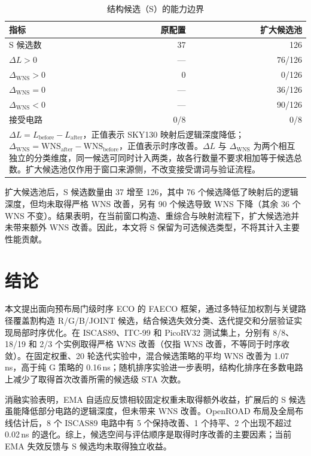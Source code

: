 \documentclass[twocolumn,10pt,fontset=windows]{ctexart}
\begin{document}
\begin{table}[H]
\centering
\caption{结构候选（S）的能力边界}
\label{tab:s_boundary}
\footnotesize
\setlength{\tabcolsep}{8pt}
\begin{tabular}{lrr}
\toprule
\textbf{指标} & \textbf{原配置} & \textbf{扩大候选池} \\
\midrule
S 候选数 & 37 & 126 \\
$\Delta L>0$ & — & 76/126 \\
$\Delta_{\mathrm{WNS}}>0$ & 0 & 0/126 \\
$\Delta_{\mathrm{WNS}}=0$ & — & 36/126 \\
$\Delta_{\mathrm{WNS}}<0$ & — & 90/126 \\
接受电路 & 0/8 & 0/8 \\
\bottomrule
\multicolumn{3}{p{0.9\columnwidth}}{\footnotesize $\Delta L=L_{\mathrm{before}}-L_{\mathrm{after}}$，正值表示 SKY130 映射后逻辑深度降低；$\Delta_{\mathrm{WNS}}=\mathrm{WNS}_{\mathrm{after}}-\mathrm{WNS}_{\mathrm{before}}$，正值表示时序改善。$\Delta L$ 与 $\Delta_{\mathrm{WNS}}$ 为两个相互独立的分类维度，同一候选可同时计入两类，故各行数量不要求相加等于候选总数。扩大候选池仅作用于窗口来源侧，不改变接受谓词与验证流程。}\\
\end{tabular}
\end{table}

扩大候选池后，S 候选数量由 37 增至 126，其中 76 个候选降低了映射后的逻辑深度，但均未取得严格 WNS 改善，另有 90 个候选导致 WNS 下降（其余 36 个 WNS 不变）。结果表明，在当前窗口构造、重综合与映射流程下，扩大候选池并未带来额外 WNS 改善。因此，本文将 S 保留为可选候选类型，不将其计入主要性能贡献。

\section{结论}\label{sec:conclusion}

本文提出面向预布局门级时序 ECO 的 FAECO 框架，通过多特征加权割与关键路径覆盖割构造 R/G/B/JOINT 候选，结合候选失效分类、迭代提交和分层验证实现局部时序优化。在 ISCAS89、ITC-99 和 PicoRV32 测试集上，分别有 8/8、18/19 和 2/3 个实例取得严格 WNS 改善（仅指 WNS 改善，不等同于时序收敛）。在固定权重、20 轮迭代实验中，混合候选策略的平均 WNS 改善为 1.07\,ns，高于纯 G 策略的 0.16\,ns；随机排序实验进一步表明，结构化排序在多数电路上减少了取得首次改善所需的候选级 STA 次数。

消融实验表明，EMA 自适应反馈相较固定权重未取得额外收益，扩展后的 S 候选虽能降低部分电路的逻辑深度，但未带来 WNS 改善。OpenROAD 布局及全局布线估计后，8 个 ISCAS89 电路中有 5 个保持改善、1 个持平、2 个出现不超过 0.02\,ns 的退化。综上，候选空间与评估顺序是取得时序改善的主要因素；当前 EMA 失效反馈与 S 候选均未取得独立收益。
\end{document}
